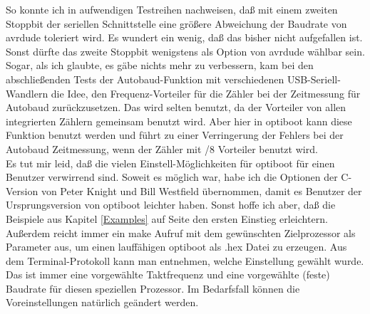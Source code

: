 So konnte ich in aufwendigen Testreihen nachweisen, daß mit einem zweiten Stoppbit der seriellen Schnittstelle
eine größere Abweichung der Baudrate von avrdude toleriert wird. Es wundert ein wenig, daß das bisher nicht
aufgefallen ist. Sonst dürfte das zweite Stoppbit wenigstens als Option von avrdude wählbar sein.\\

Sogar, als ich glaubte, es gäbe nichts mehr zu verbessern, kam bei den abschließenden Tests der Autobaud-Funktion
mit verschiedenen USB-Seriell-Wandlern die Idee, den Frequenz-Vorteiler für die Zähler bei der Zeitmessung
für Autobaud zurückzusetzen. Das wird selten benutzt, da der Vorteiler von allen integrierten Zählern gemeinsam
benutzt wird. Aber hier in optiboot kann diese Funktion benutzt werden und führt zu einer Verringerung
der Fehlers bei der Autobaud Zeitmessung, wenn der Zähler mit /8 Vorteiler benutzt wird.\\

Es tut mir leid, daß die vielen Einstell-Möglichkeiten für optiboot für einen Benutzer verwirrend sind.
Soweit es möglich war, habe ich die Optionen der C-Version von Peter Knight und Bill Westfield übernommen,
damit es Benutzer der Ursprungsversion von optiboot leichter haben.
Sonst hoffe ich aber, daß die Beispiele aus Kapitel \ref{Examples} auf Seite \pageref{Examples}
den ersten Einstieg erleichtern. Außerdem reicht immer ein make Aufruf mit dem gewünschten Zielprozessor als
Parameter aus, um einen lauffähigen optiboot als .hex Datei zu erzeugen. Aus dem Terminal-Protokoll kann man
entnehmen, welche Einstellung gewählt wurde. Das ist immer eine vorgewählte Taktfrequenz und eine
vorgewählte (feste) Baudrate für diesen speziellen Prozessor.
Im Bedarfsfall können die Voreinstellungen natürlich geändert werden.
